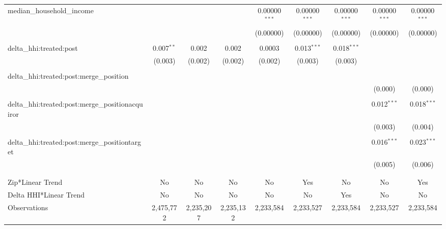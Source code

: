 \begin{table}[H]
{\begin{tabular}{@{\extracolsep{5pt}}lcccccccc}
  median\_household\_income &  &  &  & 0.00000$^{***}$ & 0.00000$^{***}$ & 0.00000$^{***}$ & 0.00000$^{***}$ & 0.00000$^{***}$ \\  

   &  &  &  & (0.00000) & (0.00000) & (0.00000) & (0.00000) & (0.00000) \\  

   & & & & & & & & \\  

  delta\_hhi:treated:post & 0.007$^{**}$ & 0.002 & 0.002 & 0.0003 & 0.013$^{***}$ & 0.018$^{***}$ &  &  \\  

   & (0.003) & (0.002) & (0.002) & (0.002) & (0.003) & (0.003) &  &  \\  

   & & & & & & & & \\  

  delta\_hhi:treated:post:merge\_position &  &  &  &  &  &  &  &  \\  

   &  &  &  &  &  &  & (0.000) & (0.000) \\  

   & & & & & & & & \\  

  delta\_hhi:treated:post:merge\_positionacquiror &  &  &  &  &  &  & 0.012$^{***}$ & 0.018$^{***}$ \\  

   &  &  &  &  &  &  & (0.003) & (0.004) \\  

   & & & & & & & & \\  

  delta\_hhi:treated:post:merge\_positiontarget &  &  &  &  &  &  & 0.016$^{***}$ & 0.023$^{***}$ \\  

   &  &  &  &  &  &  & (0.005) & (0.006) \\  

   & & & & & & & & \\  

 \hline \\[-1.8ex]  

 Zip*Linear Trend & No & No & No & No & Yes & No & No & Yes \\  

 Delta HHI*Linear Trend & No & No & No & No & No & Yes & No & No \\  

 Observations & 2,475,772 & 2,235,207 & 2,235,132 & 2,233,584 & 2,233,527 & 2,233,584 & 2,233,527 & 2,233,584 \\  


\end{tabular}}
\end{table}
